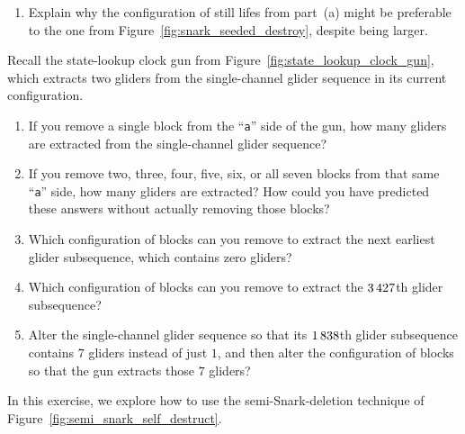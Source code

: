 \begin{multicols}{2}
\begin{problemstar}
\begin{enumerate}[label=\bf\color{ocre}(\alph*)]
			\item Explain why the configuration of still lifes from part~(a) might be preferable to the one from Figure~\ref{fig:snark_seeded_destroy}, despite being larger.
		\end{enumerate}
	\end{problemstar}


	\mfilbreak
	
	
	\begin{problem}\label{exer:0e0p_state_lookup_gun}
		Recall the state-lookup clock gun from Figure~\ref{fig:state_lookup_clock_gun}, which extracts two gliders from the single-channel glider sequence in its current configuration.\smallskip
		
		\begin{enumerate}[label=\bf\color{ocre}(\alph*)]
			\item {} If you remove a single block from the ``\texttt{a}'' side of the gun, how many gliders are extracted from the single-channel glider sequence?
			
			\item {} If you remove two, three, four, five, six, or all seven blocks from that same ``\texttt{a}'' side, how many gliders are extracted? How could you have predicted these answers without actually removing those blocks?
			
			\item {} Which configuration of blocks can you remove to extract the next earliest glider subsequence, which contains zero gliders?
			
			\item {} Which configuration of blocks can you remove to extract the $3{\,}427$th glider subsequence?
			
			\item {} Alter the single-channel glider sequence so that its $1{\,}838$th glider subsequence contains $7$ gliders instead of just $1$, and then alter the configuration of blocks so that the gun extracts those $7$ gliders?
		\end{enumerate}
	\end{problem}


	\mfilbreak
	
	
	\begin{problem}\label{exer:0e0p_clock_gun_destroy}
		In this exercise, we explore how to use the semi-Snark-deletion technique of Figure~\ref{fig:semi_snark_self_destruct}.\smallskip
		

\end{problem}
\end{multicols}

